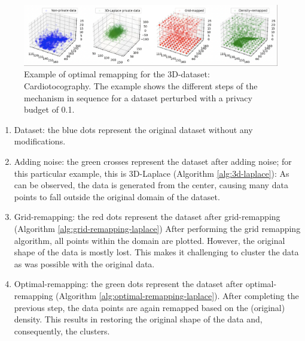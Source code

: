 \begin{figure}[H]
  \includegraphics[width=1.1\textwidth]{TheorethicalFramework//ND-Laplace//Images/optimal-remapping-example-2.png}
  \caption{Example of optimal remapping for the 3D-dataset: Cardiotocography. The example shows the different steps of the mechanism in sequence for a dataset perturbed with a privacy budget of 0.1.}
\end{figure}
\begin{enumerate}
  \item Dataset: the blue dots represent the original dataset without any modifications.
  \item Adding noise: the green crosses represent the dataset after adding noise; for this particular example, this is 3D-Laplace (Algorithm \ref{alg:3d-laplace}):
        As can be observed, the data is generated from the center, causing many data points to fall outside the original domain of the dataset.
  \item Grid-remapping: the red dots represent the dataset after grid-remapping (Algorithm \ref{alg:grid-remapping-laplace})
        After performing the grid remapping algorithm, all points within the domain are plotted.
        However, the original shape of the data is mostly lost.
        This makes it challenging to cluster the data as was possible with the original data.
  \item Optimal-remapping: the green dots represent the dataset after optimal-remapping (Algorithm \ref{alg:optimal-remapping-laplace}).
        After completing the previous step, the data points are again remapped based on the (original) density.
        This results in restoring the original shape of the data and, consequently, the clusters.
\end{enumerate}
